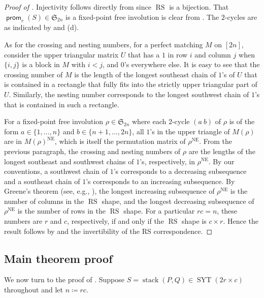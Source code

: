 \documentclass{amsart}
\theoremstyle{definition}
\DeclareMathOperator{\RS}{RS}
\DeclareMathOperator{\SYT}{SYT}
\DeclareMathOperator{\stack}{stack}
\DeclareMathOperator{\NE}{NE}
\DeclareMathOperator{\prom}{\mathsf{prom}}
\begin{document}
\begin{proof}[Proof of ]
    Injectivity follows directly from  since $\RS$ is a bijection. That $\prom_r(S) \in \mathfrak{S}_{2n}$ is a fixed-point free involution is clear from . The $2$-cycles are as indicated by  and (d).

    As for the crossing and nesting numbers, for a perfect matching $M$ on $[2n]$, consider the upper triangular matrix $U$ that has a $1$ in row $i$ and column $j$ when $\{i, j\}$ is a block in $M$ with $i < j$, and $0$'s everywhere else. It is easy to see that the crossing number of $M$ is the length of the longest southeast chain of $1$'s of $U$ that is contained in a rectangle that fully fits into the strictly upper triangular part of $U$. Similarly, the nesting number corresponds to the longest southwest chain of $1$'s that is contained in such a rectangle.

    For a fixed-point free involution $\rho \in \mathfrak{S}_{2n}$ where each $2$-cycle $(a\ b)$ of $\rho$ is of the form $a \in \{1, \ldots, n\}$ and $b \in \{n+1, \ldots, 2n\}$, all $1$'s in the upper triangle of $M(\rho)$ are in $M(\rho)^{\NE}$, which is itself the permutation matrix of $\rho^{\NE}$. From the previous paragraph, the crossing and nesting numbers of $\rho$ are the lengths of the longest southeast and southwest chains of $1$'s, respectively, in $\rho^{\NE}$. By our conventions, a southwest chain of $1$'s corresponds to a decreasing subsequence and a southeast chain of $1$'s corresponds to an increasing subsequence. By Greene's theorem (see, e.g., \cite[Thm.~3.5.3]{Sagan-symmetric-group}), the longest increasing subsequence of $\rho^{\NE}$ is the number of columns in the $\RS$ shape, and the longest decreasing subsequence of $\rho^{\NE}$ is the number of rows in the $\RS$ shape. For a particular $rc=n$, these numbers are $r$ and $c$, respectively, if and only if the $\RS$ shape is $c \times r$. Hence the result follows by  and the invertibility of the RS correspondence.
\end{proof}

\subsection{Main theorem proof}\label{sec:main-proof}

We now turn to the proof of . Suppose $S = \stack(P, Q) \in \SYT(2r \times c)$ throughout and let $n \coloneqq rc$.
\end{document}
